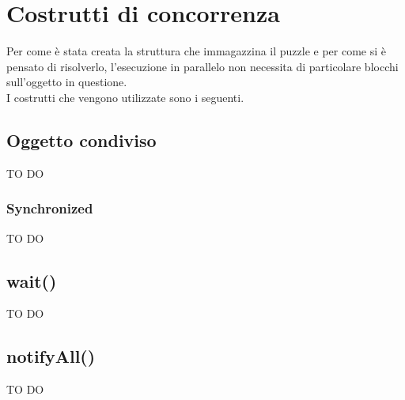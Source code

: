 % 
%
%

\section{Costrutti di concorrenza} %
\label{sec:costrutti_di_concorrenza}
Per come è stata creata la struttura che immagazzina il puzzle e per come si è pensato di risolverlo, l'esecuzione in parallelo non necessita di particolare blocchi sull'oggetto in questione. \\
I costrutti che vengono utilizzate sono i seguenti.

	\subsection{Oggetto condiviso} %
	\label{sub:oggetto_condiviso}
	TO DO

	\subsubsection{Synchronized} %
	\label{ssub:synchronized}
	TO DO
	
	\subsection{wait()} %
	\label{sub:wait_}
	TO DO
	
	\subsection{notifyAll()} %
	\label{sub:notifyall_}
	TO DO



